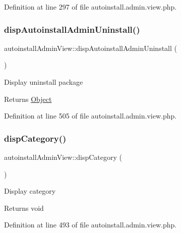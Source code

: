 Definition at line 297 of file autoinstall.\+admin.\+view.\+php.

\hypertarget{classautoinstallAdminView_a5f7303fa7b93ab464b65e0917b8d75ca}{}\label{classautoinstallAdminView_a5f7303fa7b93ab464b65e0917b8d75ca} 
\subsubsection{\texorpdfstring{disp\+Autoinstall\+Admin\+Uninstall()}{dispAutoinstallAdminUninstall()}}
{\footnotesize\ttfamily autoinstall\+Admin\+View\+::disp\+Autoinstall\+Admin\+Uninstall (\begin{DoxyParamCaption}{ }\end{DoxyParamCaption})}

Display uninstall package

\begin{DoxyReturn}{Returns}
\hyperlink{classObject}{Object} 
\end{DoxyReturn}


Definition at line 505 of file autoinstall.\+admin.\+view.\+php.

\hypertarget{classautoinstallAdminView_ac3b285aaf0eb96bbfb2986917ca3571b}{}\label{classautoinstallAdminView_ac3b285aaf0eb96bbfb2986917ca3571b} 
\subsubsection{\texorpdfstring{disp\+Category()}{dispCategory()}}
{\footnotesize\ttfamily autoinstall\+Admin\+View\+::disp\+Category (\begin{DoxyParamCaption}{ }\end{DoxyParamCaption})}

Display category

\begin{DoxyReturn}{Returns}
void 
\end{DoxyReturn}


Definition at line 493 of file autoinstall.\+admin.\+view.\+php.

\hypertarget{classautoinstallAdminView_a206401d0dc48b6d0e60f1520ba972526}{}\label{classautoinstallAdminView_a206401d0dc48b6d0e60f1520ba972526} 
